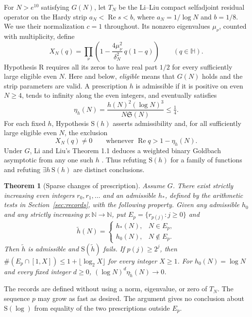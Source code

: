\documentclass[11pt,a4paper]{article}
\newtheorem{theorem}{Theorem}[section]
\newcommand{\SSg}{\mathfrak S}
\DeclareMathOperator{\Rea}{Re}
\begin{document}
For $N>e^{10}$ satisfying $G(N)$, let $T_N$ be the Li--Liu compact selfadjoint residual operator on the Hardy strip $a_N<\Rea s<b$, where $a_N=1/\log N$ and $b=1/8$. We use their normalization $c=1$ throughout. Its nonzero eigenvalues $\mu_\nu$, counted with multiplicity, define
\[
 X_N(q)=\prod_\nu\left(1-\frac{4\mu_\nu^2}{\delta_N^2}\,q(1-q)\right)
 \qquad(q\in\mathbb H).
\]
Hypothesis R requires all its zeros to have real part $1/2$ for every sufficiently large eligible even $N$. Here and below, \emph{eligible} means that $G(N)$ holds and the strip parameters are valid. A prescription $h$ is admissible if it is positive on even $N\ge4$, tends to infinity along the even integers, and eventually satisfies
\[
  \eta_h(N)=\frac{h(N)^2(\log N)^3}{N\SSg(N)}\le \tfrac14 .
\]
For each fixed $h$, Hypothesis $\mathrm S(h)$ asserts admissibility and, for all sufficiently large eligible even $N$, the exclusion
\begin{equation}\label{eq:free}
 X_N(q)\ne0 \qquad\text{whenever }\Rea q>1-\eta_h(N).
\end{equation}
Under $G$, Li and Liu's Theorem 1.1 deduces a weighted binary Goldbach asymptotic from any one such $h$ \cite{LL}. Thus refuting $\mathrm S(h)$ for a family of functions and refuting $\exists h\,\mathrm S(h)$ are distinct conclusions.

\begin{theorem}[Sparse changes of prescription]\label{th:sparse}
Assume $G$. There exist strictly increasing even integers $r_0,r_1,\dots$ and an admissible $h_*$, defined by the arithmetic tests in Section~\ref{sec:records}, with the following property. Given any admissible $h_0$ and any strictly increasing $p:\mathbb N\to\mathbb N$, put $E_p=\{r_{p(j)}:j\ge0\}$ and
\[
 \widetilde h(N)=
 \begin{cases}h_*(N),&N\in E_p,\\ h_0(N),&N\notin E_p.\end{cases}
\]
Then $\widetilde h$ is admissible and $\mathrm S(\widetilde h)$ fails. If $p(j)\ge2^j$, then
$\#(E_p\cap[1,X])\le 1+\lfloor\log_2 X\rfloor$ for every integer $X\ge1$.
For $h_0(N)=\log N$ and every fixed integer $d\ge0$,
$(\log N)^d\eta_{\widetilde h}(N)\to0$.
\end{theorem}

The records are defined without using a norm, eigenvalue, or zero of $T_N$. The sequence $p$ may grow as fast as desired. The argument gives no conclusion about $\mathrm S(\log)$ from equality of the two prescriptions outside $E_p$.
\end{document}
